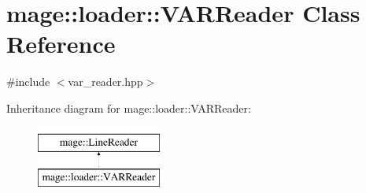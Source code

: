 \hypertarget{classmage_1_1loader_1_1_v_a_r_reader}{}\section{mage\+:\+:loader\+:\+:V\+A\+R\+Reader Class Reference}
\label{classmage_1_1loader_1_1_v_a_r_reader}


{\ttfamily \#include $<$var\+\_\+reader.\+hpp$>$}

Inheritance diagram for mage\+:\+:loader\+:\+:V\+A\+R\+Reader\+:\begin{figure}[H]
\begin{center}
\leavevmode
\includegraphics[height=2.000000cm]{classmage_1_1loader_1_1_v_a_r_reader}
\end{center}
\end{figure}
